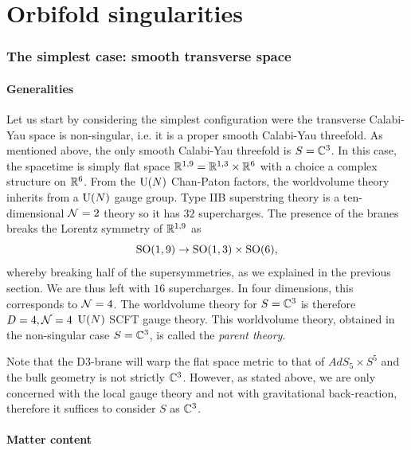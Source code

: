 \part{Orbifold singularities}

\section{The simplest case: smooth transverse space}

    \subsection{Generalities}

        Let us start by considering the simplest configuration were the transverse Calabi-Yau space is non-singular, i.e. it is a proper smooth Calabi-Yau threefold. As mentioned above, the only smooth Calabi-Yau threefold is $S=\mathbb{C}^3$. In this case, the spacetime is simply flat space $\mathbb{R}^{1,9}=\mathbb{R}^{1,3}\times\mathbb{R}^6$ with a choice a complex structure on $\mathbb{R}^6$. From the $\text{U}(N)$ Chan-Paton factors, the worldvolume theory inherits from a $\text{U}(N)$ gauge group. Type IIB superstring theory is a ten-dimensional $\mathcal{N}=2$ theory so it has $32$ supercharges. The presence of the branes breaks the Lorentz symmetry of $\mathbb{R}^{1,9}$ as
        \begin{equation}
            \text{SO}(1,9)\to\text{SO}(1,3)\times\text{SO}(6),
        \end{equation}
        whereby breaking half of the supersymmetries, as we explained in the previous section. We are thus left with $16$ supercharges. In four dimensions, this corresponds to $\mathcal{N}=4$. The worldvolume theory for $S=\mathbb{C}^3$ is therefore $D=4,\mathcal{N}=4$ $\text{U}(N)$ SCFT gauge theory. This worldvolume theory, obtained in the non-singular case $S=\mathbb{C}^3$, is called the \emph{parent theory}.

        Note that the D$3$-brane will warp the flat space metric to that of $AdS_5\times S^5$ and the bulk geometry is not strictly $\mathbb{C}^3$. However, as stated above, we are only concerned with the local gauge theory and not with gravitational back-reaction, therefore it suffices to consider $S$ as $\mathbb{C}^3$.

    \subsection{Matter content}

